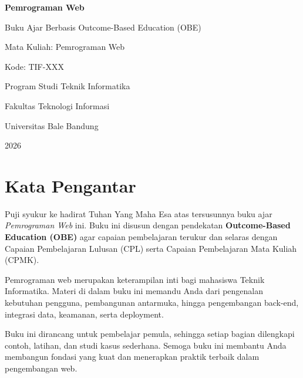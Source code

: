 \frontmatter

\begin{titlepage}
  \centering
  \vspace*{1cm}
  {\LARGE\bfseries Pemrograman Web\par}
  \vspace{0.5cm}
  {\large Buku Ajar Berbasis Outcome-Based Education (OBE)\par}
  \vspace{1cm}
  {\large Mata Kuliah: Pemrograman Web\par}
  {\large Kode: TIF-XXX\par}
  \vspace{2cm}
  {\large Program Studi Teknik Informatika\par}
  {\large Fakultas Teknologi Informasi\par}
  {\large Universitas Bale Bandung\par}
  \vfill
  {\large 2026\par}
\end{titlepage}

\cleardoublepage

\chapter*{Kata Pengantar}

Puji syukur ke hadirat Tuhan Yang Maha Esa atas tersusunnya buku ajar \textit{Pemrograman Web} ini. Buku ini disusun dengan pendekatan \textbf{Outcome-Based Education (OBE)} agar capaian pembelajaran terukur dan selaras dengan Capaian Pembelajaran Lulusan (CPL) serta Capaian Pembelajaran Mata Kuliah (CPMK).

Pemrograman web merupakan keterampilan inti bagi mahasiswa Teknik Informatika. Materi di dalam buku ini memandu Anda dari pengenalan kebutuhan pengguna, pembangunan antarmuka, hingga pengembangan back-end, integrasi data, keamanan, serta deployment.

Buku ini dirancang untuk pembelajar pemula, sehingga setiap bagian dilengkapi contoh, latihan, dan studi kasus sederhana. Semoga buku ini membantu Anda membangun fondasi yang kuat dan menerapkan praktik terbaik dalam pengembangan web.

